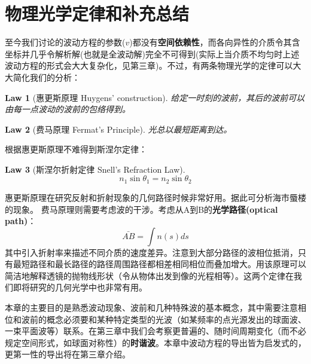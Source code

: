 \documentclass[12pt]{ctexart}%
\newtheorem{theorem}{Law}
\begin{document}
\section*{物理光学定律和补充总结}
至今我们讨论的波动方程的参数($v$)都没有\textbf{空间依赖性}，而各向异性的介质令其含坐标并几乎令解析解(也就是全波动解)完全不可得到(实际上当介质不均匀时上述波动方程的形式会大大复杂化，见第三章)。不过，有两条物理光学的定律可以大大简化我们的分析：
\begin{theorem}[惠更斯原理 Huygens’ construction]
    给定一时刻的波前，其后的波前可以由每一点波动的波前的包络得到。
\end{theorem}
\begin{theorem}[费马原理 Fermat’s Principle]
    光总以最短距离到达。
\end{theorem}
根据惠更斯原理不难得到斯涅尔定律：
\begin{theorem}[斯涅尔折射定律 Snell's Refraction Law]
    \begin{equation}
        n_1\sin{\theta_1}=n_2\sin{\theta_2}
    \end{equation}
\end{theorem}
\indent 惠更斯原理在研究反射和折射现象的几何路径时候非常好用。据此可分析海市蜃楼的现象。
费马原理则需要考虑波的干涉。考虑从A到B的\textbf{光学路径(optical path)}：
\begin{equation}
    \bar{AB}=\int n(s)ds
\end{equation}
其中引入折射率来描述不同介质的速度差异。注意到大部分路径的波相位抵消，只有最短路径和最长路径的路径周围路径都相差相同相位而叠加增大。用该原理可以简洁地解释透镜的抛物线形状（令从物体出发到像的光程相等）。这两个定律在我们即将研究的几何光学中也非常有用。
\par 本章的主要目的是熟悉波动现象、波前和几种特殊波的基本概念，其中需要注意相位和波前的概念必须要和某种特定类型的光波（如某频率的点光源发出的球面波、一束平面波等）联系。在第三章中我们会考察更普遍的、随时间周期变化（而不必规定空间形式，如球面对称性）的\textbf{时谐波}。本章中波动方程的导出皆为启发式的，更第一性的导出将在第三章介绍。
\end{document}

